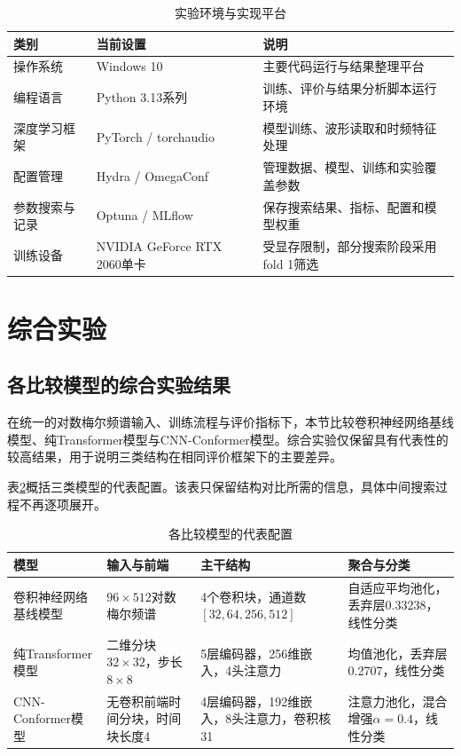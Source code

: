 \begin{table}[!htbp]
    \centering
    \caption{实验环境与实现平台}
    \label{tab:chapter4_runtime_env}
    \begin{tabular}{p{}p{}p{}}
        \toprule
        类别 & 当前设置 & 说明 \\
        \midrule
        操作系统 & Windows 10 & 主要代码运行与结果整理平台 \\
        编程语言 & Python 3.13系列 & 训练、评价与结果分析脚本运行环境 \\
        深度学习框架 & PyTorch / torchaudio & 模型训练、波形读取和时频特征处理 \\
        配置管理 & Hydra / OmegaConf & 管理数据、模型、训练和实验覆盖参数 \\
        参数搜索与记录 & Optuna / MLflow & 保存搜索结果、指标、配置和模型权重 \\
        训练设备 & NVIDIA GeForce RTX 2060单卡 & 受显存限制，部分搜索阶段采用fold 1筛选 \\
        \bottomrule
    \end{tabular}
\end{table}

\section{综合实验}

\subsection{各比较模型的综合实验结果}

在统一的对数梅尔频谱输入、训练流程与评价指标下，本节比较卷积神经网络基线模型、纯Transformer模型与CNN-Conformer模型。综合实验仅保留具有代表性的较高结果，用于说明三类结构在相同评价框架下的主要差异。

表\ref{tab:chapter4_model_representative_configs}概括三类模型的代表配置。该表只保留结构对比所需的信息，具体中间搜索过程不再逐项展开。

\begin{table}[!htbp]
    \centering
    \caption{各比较模型的代表配置}
    \label{tab:chapter4_model_representative_configs}
    \footnotesize
    \setlength{\tabcolsep}{3pt}
    \renewcommand{\arraystretch}{0.95}
    \begin{tabularx}{\textwidth}{p{}XXX}
        \toprule
        模型 & 输入与前端 & 主干结构 & 聚合与分类 \\
        \midrule
        卷积神经网络基线模型 & $96 \times 512$对数梅尔频谱 & 4个卷积块，通道数$[32,64,256,512]$ & 自适应平均池化，丢弃层0.33238，线性分类 \\
        纯Transformer模型 & 二维分块$32 \times 32$，步长$8 \times 8$ & 5层编码器，256维嵌入，4头注意力 & 均值池化，丢弃层0.2707，线性分类 \\
        CNN-Conformer模型 & 无卷积前端时间分块，时间块长度4 & 4层编码器，192维嵌入，8头注意力，卷积核31 & 注意力池化，混合增强$\alpha=0.4$，线性分类 \\
        \bottomrule
    \end{tabularx}
\end{table}



